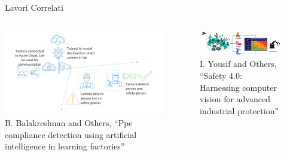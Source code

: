 \documentclass{beamer}
\begin{document}
\begin{frame}{Lavori Correlati}
  \begin{columns}
    \begin{column}{0.5\textwidth}
      \centering
      \includegraphics[width=\textwidth]{images/relw1-system.png}
      \tiny B. Balakreshnan and Others, “Ppe compliance detection using artificial
intelligence in learning factories”
    \end{column}

    \begin{column}{0.5\textwidth}
      \begin{figure}
      \centering
      \includegraphics[width=\textwidth]{images/safety-system.png}
      \caption{\tiny {I. Yousif and Others, “Safety 4.0: Harnessing computer vision for
advanced industrial protection”}}
	\end{figure} 
    \end{column}
  \end{columns}
\end{frame}

\end{document}
